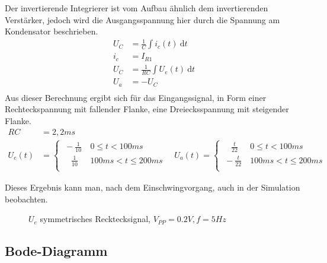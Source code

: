 Der invertierende Integrierer ist vom Aufbau ähnlich dem invertierenden Verstärker, jedoch wird die Ausgangsspannung hier durch die Spannung am Kondensator beschrieben.\\
\begin{align*}
 U_C &= \frac{1}{C} \int i_c(t)\ \mathrm{d}t\\
 i_c &= I_{R1}\\
 U_C &= \frac{1}{RC} \int U_e(t)\ \mathrm{d}t\\
 U_a &= -U_C\\
\end{align*}
\noindent
Aus dieser Berechnung ergibt sich für das Eingangssignal, in Form einer Rechteckspannung mit fallender Flanke, eine Dreiecksspannung mit steigender Flanke.\\
\begin{align*}
 RC &= 2,2ms\\
 U_e(t) &=
  \begin{cases}
   \ -\frac{1}{10}\ &0 \leq t < 100ms\\
   \quad \frac{1}{10}\ &100ms < t \leq 200ms\\
  \end{cases}
  \quad
  U_a(t) =
  \begin{cases}
   \quad \frac{t}{22}\ &0 \leq t < 100ms\\
   \ -\frac{t}{22}\ &100ms < t \leq 200ms\\
  \end{cases}
\end{align*}

Dieses Ergebnis kann man, nach dem Einschwingvorgang, auch in der Simulation beobachten.\\

\begin{figure}[H]
  \centering
  \caption{$U_e$ symmetrisches Recktecksignal, $V_{PP}=0.2V, f=5Hz$}
\end{figure}

\subsection{Bode-Diagramm}

